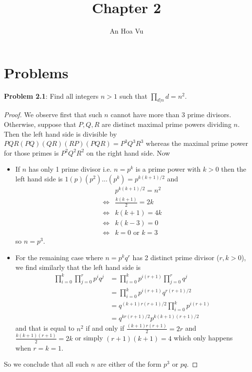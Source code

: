 \documentclass{article}
\title{Chapter 2}
\author{An Hoa Vu}
\begin{document}
\maketitle
\fi

\section{Problems}

\textbf{Problem 2.1}: Find all integers $n > 1$ such that $\prod_{d | n} d = n^2$.

\begin{proof}
We observe first that such $n$ cannot have more than 3 prime divisors. Otherwise, suppose that $P, Q, R$ are distinct maximal prime powers dividing $n$. Then the left hand side is divisible by $P Q R (PQ) (QR) (RP) (PQR) = P^3 Q^3 R^3$ whereas the maximal prime power for those primes is $P^2 Q^2 R^2$ on the right hand side. Now

\begin{itemize}
\item If $n$ has only 1 prime divisor i.e. $n = p^k$ is a prime power with $k > 0$ then the left hand side is $1 (p) (p^2) ... (p^k) = p^{k(k+1)/2}$ and
\begin{align*}
& p^{k(k+1)/2} = n^2\\
\iff & \frac{k(k+1)}{2} = 2k\\
\iff & k(k+1) = 4k\\
\iff & k(k - 3) = 0\\
\iff & k = 0 \text{ or } k = 3
\end{align*}
so $n = p^3$.

\item For the remaining case where $n = p^k q^r$ has 2 distinct prime divisor ($r, k > 0$), we find similarly that the left hand side is
\begin{align*}
\prod_{i = 0}^{k} \prod_{j = 0}^{r} p^i q^j
&= \prod_{i = 0}^{k} p^{i (r+1)} \prod_{j = 0}^{r}  q^j\\
&= \prod_{i = 0}^{k} p^{i (r+1)} q^{r(r+1)/2}\\
&= q^{(k+1) r(r+1)/2} \prod_{i = 0}^{k} p^{i (r+1)}\\
&= q^{kr(r+1)/2} p^{k(k+1)(r+1)/2}
\end{align*}
and that is equal to $n^2$ if and only if $\frac{(k+1)r(r+1)}{2} = 2r$ and $\frac{k(k+1)(r+1)}{2} = 2k$ or simply $(r + 1)(k + 1) = 4$ which only happens when $r = k = 1$.
\end{itemize}

So we conclude that all such $n$ are either of the form $p^3$ or $pq$.
\end{proof}
\end{document}
